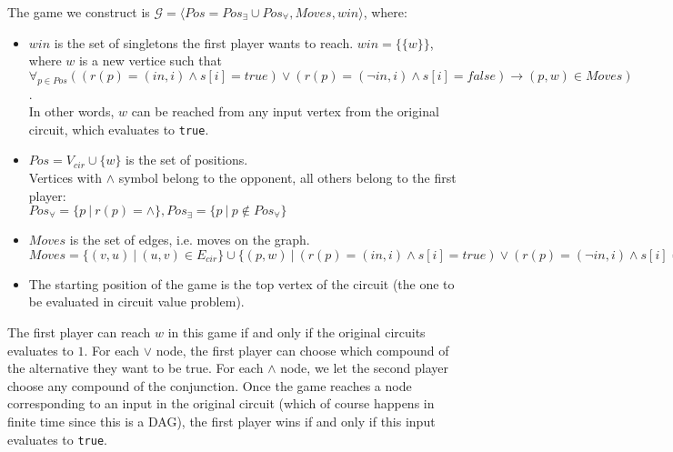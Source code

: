 \noindent
The game we construct is $\mathcal{G} = \langle Pos = Pos_{\exists} \cup Pos_{\forall}, Moves, win \rangle$, where:
\begin{itemize}
      \item $win$ is the set of singletons the first player wants to reach.
            $win = \{\{ w \}\}$, where $w$ is a new vertice such that\\
            $\forall_{p \in Pos} ((r(p) = (in,i) \land s[i] = true) \lor (r(p) = (\lnot in,i) \land s[i] = false) \rightarrow (p, w) \in Moves)$.\\
            In other words, $w$ can be reached from any input vertex from the original circuit, which evaluates to \texttt{true}.
      \item $Pos = V_{cir} \cup \{w\}$ is the set of positions.\\
            Vertices with $\land$ symbol belong to the opponent, all others belong to the first player:\\
            $Pos_{\forall} = \{p\ |\ r(p) = \land\}, Pos_{\exists} = \{p\ |\ p \not\in Pos_{\forall}\}$
      \item $Moves$ is the set of edges, i.e. moves on the graph.\\
            $Moves = \{(v,u)\ |\ (u,v) \in E_{cir}\} \cup \{(p,w)\ |\ (r(p) = (in,i) \land s[i] = true) \lor (r(p) = (\lnot in,i) \land s[i] = false)\}$
      \item The starting position of the game is the top vertex of the circuit (the one to be evaluated in circuit value problem).
\end{itemize}
The first player can reach $w$ in this game if and only if the original circuits evaluates to $1$.
For each $\lor$ node, the first player can choose which compound of the alternative they want to be true.
For each $\land$ node, we let the second player choose any compound of the conjunction. Once the game
reaches a node corresponding to an input in the original circuit (which of course happens in finite time
since this is a DAG), the first player wins if and only if this input evaluates to \texttt{true}.